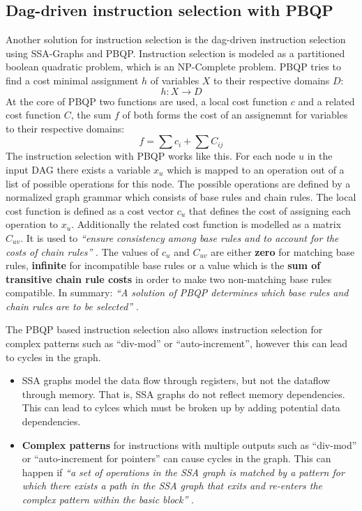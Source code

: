 \documentclass[a4paper,10pt]{article}
\begin{document}
\subsection{Dag-driven instruction selection with PBQP}
Another solution for instruction selection is the dag-driven instruction selection using SSA-Graphs and PBQP. Instruction 
selection is modeled as a partitioned boolean quadratic problem, which is 
an NP-Complete problem. PBQP tries to find a cost minimal assignment $h$ of variables $X$ to their respective domains $D$:
\[ h: X \rightarrow D\]
At the core of PBQP two functions are used, a local cost function $c$ and a related cost function $C$, the sum $f$ of both forms 
the cost of an assignemnt for variables to their respective domains:
\[ f = \sum c_i + \sum{C_{ij}} \]
The instruction selection with PBQP works like this. For each node $u$ in the input DAG there exists a variable $x_u$ which is 
mapped to an operation out of a list of possible operations for this node. The possible operations are defined by a normalized 
graph grammar which consists of base rules and chain rules. The local cost function is defined as a 
cost vector $c_u$ that defines the cost of assigning each operation to $x_u$. Additionally the related cost function is modelled as 
a matrix $C_{uv}$. It is used to \textit{``ensure consistency among base rules and to account for the costs of chain rules''}
\cite{pbqp-instruction-selection}. The values of $c_u$ and $C_{uv}$ are either \textbf{zero} for matching base rules, 
\textbf{infinite} for incompatible 
base rules or a value which is the \textbf{sum of transitive chain rule costs} in order to make two non-matching base rules 
compatible. In summary: \textit{``A solution of PBQP determines which base rules and chain rules are to be selected''}
\cite{pbqp-instruction-selection}.

The PBQP based instruction selection also allows instruction selection for complex patterns such as ``div-mod'' or ``auto-increment'', 
however this can lead to cycles in the graph.
\begin{itemize}
    \item SSA graphs model the data flow through registers, but not the dataflow through memory. That is, SSA graphs do not reflect 
    memory dependencies. This can lead to cylces which must be broken up by adding potential data dependencies.
    \item \textbf{Complex patterns} for instructions with multiple outputs such as ``div-mod'' or ``auto-increment for pointers'' can 
          cause cycles in the graph. This can happen if \textit{``a set of operations in the SSA graph is matched by a pattern for which 
          there exists a path in the SSA graph that exits and re-enters the complex pattern within the basic block''}
          \cite{pbqp-instruction-selection}.
\end{itemize}
\end{document}
